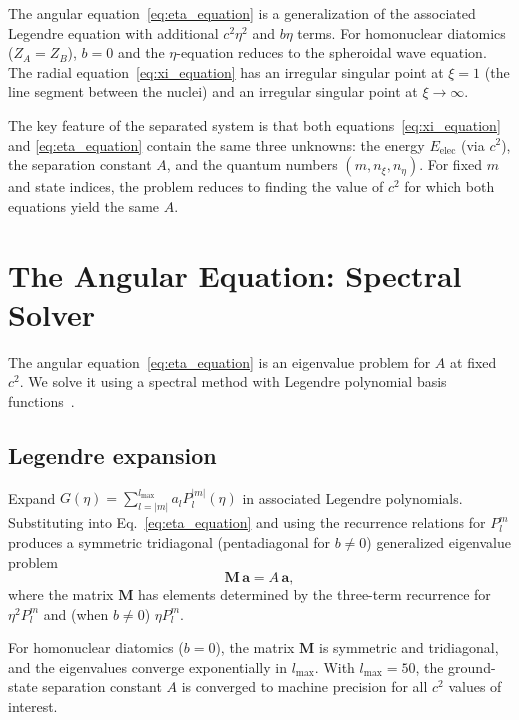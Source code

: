 \documentclass[aps,pra,twocolumn,superscriptaddress,longbibliography]{revtex4-2}
\begin{document}
The angular equation~\eqref{eq:eta_equation} is a generalization of
the associated Legendre equation with additional $c^2\eta^2$ and
$b\eta$ terms.  For homonuclear diatomics ($Z_A = Z_B$), $b = 0$ and
the $\eta$-equation reduces to the spheroidal wave equation.  The
radial equation~\eqref{eq:xi_equation} has an irregular singular
point at $\xi = 1$ (the line segment between the nuclei) and an
irregular singular point at $\xi \to \infty$.

The key feature of the separated system is that both
equations~\eqref{eq:xi_equation} and \eqref{eq:eta_equation}
contain the same three unknowns: the energy $E_{\mathrm{elec}}$
(via $c^2$), the separation constant $A$, and the quantum numbers
$(m, n_\xi, n_\eta)$.  For fixed $m$ and state indices, the problem
reduces to finding the value of $c^2$ for which both equations yield
the same $A$.


\section{The Angular Equation: Spectral Solver}
\label{sec:angular}

The angular equation~\eqref{eq:eta_equation} is an eigenvalue problem
for $A$ at fixed $c^2$.  We solve it using a spectral method with
Legendre polynomial basis functions~\cite{Flammer1957}.

\subsection{Legendre expansion}

Expand $G(\eta) = \sum_{l=|m|}^{l_{\max}} a_l P_l^{|m|}(\eta)$
in associated Legendre polynomials.  Substituting into
Eq.~\eqref{eq:eta_equation} and using the recurrence relations
for $P_l^m$ produces a symmetric tridiagonal (pentadiagonal for
$b \neq 0$) generalized eigenvalue problem
\begin{equation}
  \mathbf{M}\,\mathbf{a} = A\,\mathbf{a},
  \label{eq:angular_eigenproblem}
\end{equation}
where the matrix $\mathbf{M}$ has elements determined by the
three-term recurrence for $\eta^2 P_l^m$ and (when $b \neq 0$)
$\eta P_l^m$.

For homonuclear diatomics ($b = 0$), the matrix $\mathbf{M}$ is
symmetric and tridiagonal, and the eigenvalues converge exponentially
in $l_{\max}$.  With $l_{\max} = 50$, the ground-state separation
constant $A$ is converged to machine precision for all $c^2$ values
of interest.
\end{document}
